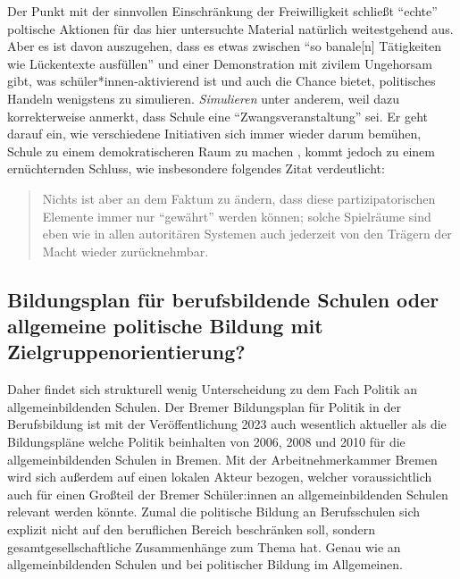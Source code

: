 Der Punkt mit der sinnvollen Einschränkung der Freiwilligkeit schließt \enquote{echte} poltische Aktionen für das hier untersuchte Material natürlich weitestgehend aus. Aber es ist davon auszugehen, dass es etwas zwischen \enquote{so banale[n] Tätigkeiten wie Lückentexte ausfüllen} \autocite[466]{Nonnenmacher2010} und einer Demonstration mit zivilem Ungehorsam gibt, was schüler*innen-aktivierend ist und auch die Chance bietet, politisches Handeln wenigstens zu simulieren. 
\emph{Simulieren} unter anderem, weil \textcite[467]{Nonnenmacher2010} dazu korrekterweise anmerkt, dass Schule eine \enquote{Zwangsveranstaltung} sei. Er geht darauf ein, wie verschiedene Initiativen sich immer wieder darum bemühen, Schule zu einem demokratischeren Raum zu machen \autocite[467-469]{Nonnenmacher2010}, kommt jedoch zu einem ernüchternden Schluss, wie insbesondere folgendes Zitat verdeutlicht:
\begin{quote}
    Nichts ist aber an dem Faktum zu ändern, dass diese partizipatorischen Elemente immer nur \enquote{gewährt} werden können; solche Spielräume sind eben wie in allen autoritären Systemen auch jederzeit von den Trägern der Macht wieder zurücknehmbar. 

    \autocite[468]{Nonnenmacher2010}
\end{quote}




\subsection{Bildungsplan für berufsbildende Schulen oder allgemeine politische Bildung mit Zielgruppenorientierung?}
Daher findet sich strukturell wenig Unterscheidung zu dem Fach Politik an allgemeinbildenden Schulen.
Der Bremer Bildungsplan für Politik in der Berufsbildung ist mit der Veröffentlichung 2023 auch wesentlich aktueller als die Bildungspläne welche Politik beinhalten von 2006, 2008 und 2010 für die allgemeinbildenden Schulen in Bremen. 
Mit der Arbeitnehmerkammer Bremen wird sich außerdem auf einen lokalen Akteur bezogen, welcher voraussichtlich auch für einen Großteil der Bremer Schüler:innen an allgemeinbildenden Schulen relevant werden könnte. 
Zumal die politische Bildung an Berufsschulen sich explizit nicht auf den beruflichen Bereich beschränken soll, sondern gesamtgesellschaftliche Zusammenhänge zum Thema hat. Genau wie an allgemeinbildenden Schulen und bei politischer Bildung im Allgemeinen.

